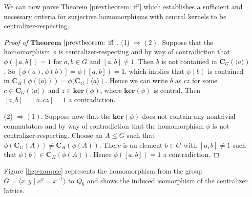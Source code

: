 \documentclass[12pt]{amsart}
\begin{document}
We can now prove Theorem \ref{prevtheorem: iff} which establishes a sufficient and necessary criteria for surjective homomorphisms with central kernels to be centralizer-respecting. 

\begin{proof}[Proof of $\mathbf{Theorem}$ $\mathbf{\ref{prevtheorem: iff}}$]
(1) $\Rightarrow (2)$. Suppose that the homomorphism $\phi$ is centralizer-respecting and by way of contradiction that $\phi([a,b])=1$ for $a,b\in G$ and $[a,b]\neq 1$. Then $b$ is not contained in $\mathbf{C}_G(\langle a \rangle )$. So $[\phi(a),\phi(b)] = \phi([a,b]) = 1$, which implies that $\phi(b)$ is contained in $\mathbf{C}_H(\phi(\langle a\rangle)) = \phi(\mathbf{C}_G(\langle a \rangle)$. Hence we can write $b$ as $c z$ for some $c\in \mathbf{C}_G(\langle a \rangle)$ and $z\in \mathbf{ker}(\phi)$, where $\mathbf{ker}(\phi)$ is central. Then $[a,b] = [a,cz] = 1$ a contradiction. 

(2) $\Rightarrow (1)$. Suppose now that the $\mathbf{ker}(\phi)$ does not contain any nontrivial commutators and by way of contradiction that the homomorphism $\phi$ is not centralizer-respecting. Choose an $A\leq G$ such that $\phi(\mathbf{C}_G(A)) \neq \mathbf{C}_H(\phi(A))$. There is an element $b\in G$ with $[a,b]\neq 1$ such that $\phi(b) \in \mathbf{C}_H(\phi(A))$. Hence $\phi([a,b])=1$ a contradiction.
\end{proof} 

Figure \ref{fig:example} represents the homomorphism from the group $G=\langle x, y \; | \; x^y = x^{-1} \rangle$ to $Q_8$ and shows the induced isomorphism of the centralizer lattice. 
\end{document}
